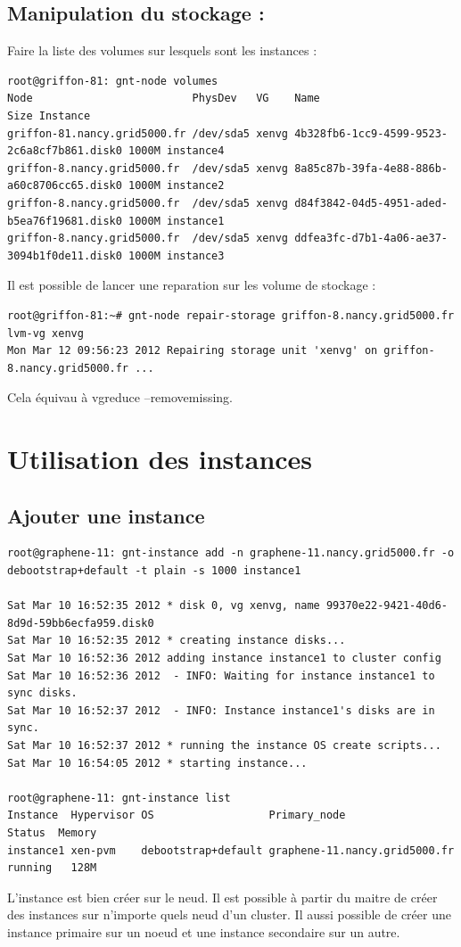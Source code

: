 \subsection {Manipulation du stockage :}

Faire la liste des volumes sur lesquels sont les instances : 
\begin{lstlisting}
root@griffon-81: gnt-node volumes
Node                         PhysDev   VG    Name                                        Size Instance 
griffon-81.nancy.grid5000.fr /dev/sda5 xenvg 4b328fb6-1cc9-4599-9523-2c6a8cf7b861.disk0 1000M instance4
griffon-8.nancy.grid5000.fr  /dev/sda5 xenvg 8a85c87b-39fa-4e88-886b-a60c8706cc65.disk0 1000M instance2
griffon-8.nancy.grid5000.fr  /dev/sda5 xenvg d84f3842-04d5-4951-aded-b5ea76f19681.disk0 1000M instance1
griffon-8.nancy.grid5000.fr  /dev/sda5 xenvg ddfea3fc-d7b1-4a06-ae37-3094b1f0de11.disk0 1000M instance3
\end{lstlisting}
Il est possible de lancer une reparation sur les volume de stockage :
\begin{lstlisting}
root@griffon-81:~# gnt-node repair-storage griffon-8.nancy.grid5000.fr lvm-vg xenvg
Mon Mar 12 09:56:23 2012 Repairing storage unit 'xenvg' on griffon-8.nancy.grid5000.fr ...
\end{lstlisting}
Cela équivau à vgreduce --removemissing.



\section {Utilisation des instances}

\subsection {Ajouter une instance}
\begin{lstlisting}
root@graphene-11: gnt-instance add -n graphene-11.nancy.grid5000.fr -o debootstrap+default -t plain -s 1000 instance1

Sat Mar 10 16:52:35 2012 * disk 0, vg xenvg, name 99370e22-9421-40d6-8d9d-59bb6ecfa959.disk0
Sat Mar 10 16:52:35 2012 * creating instance disks...
Sat Mar 10 16:52:36 2012 adding instance instance1 to cluster config
Sat Mar 10 16:52:36 2012  - INFO: Waiting for instance instance1 to sync disks.
Sat Mar 10 16:52:37 2012  - INFO: Instance instance1's disks are in sync.
Sat Mar 10 16:52:37 2012 * running the instance OS create scripts...
Sat Mar 10 16:54:05 2012 * starting instance...

root@graphene-11: gnt-instance list
Instance  Hypervisor OS                  Primary_node                  Status  Memory
instance1 xen-pvm    debootstrap+default graphene-11.nancy.grid5000.fr running   128M
\end{lstlisting}
L'instance est bien créer sur le neud. Il est possible à partir du maitre de créer des instances sur n'importe quels neud d'un cluster. Il aussi possible de créer une instance primaire sur un noeud et une instance secondaire sur un autre.

